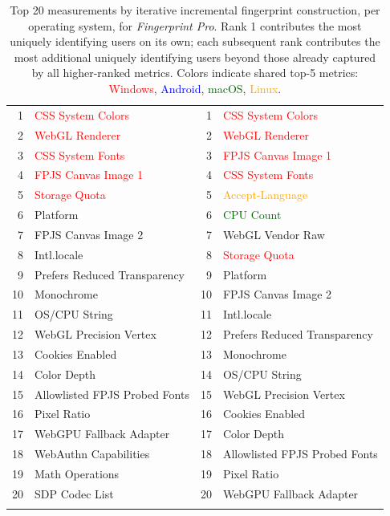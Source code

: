 \begin{table}[H]
\begin{tabular}{r l | r l}
\Xhline{2\arrayrulewidth}
1 & \textcolor{red}{CSS System Colors} & 1 & \textcolor{red}{CSS System Colors} \\
2 & \textcolor{red}{WebGL Renderer} & 2 & \textcolor{red}{WebGL Renderer} \\
3 & \textcolor{red}{CSS System Fonts} & 3 & \textcolor{red}{FPJS Canvas Image 1} \\
4 & \textcolor{red}{FPJS Canvas Image 1} & 4 & \textcolor{red}{CSS System Fonts} \\
5 & \textcolor{red}{Storage Quota} & 5 & \textcolor{orange}{Accept-Language} \\
6 & Platform & 6 & \textcolor{darkgreen}{CPU Count} \\
7 & FPJS Canvas Image 2 & 7 & WebGL Vendor Raw \\
8 & Intl.locale & 8 & \textcolor{red}{Storage Quota} \\
9 & Prefers Reduced Transparency & 9 & Platform \\
10 & Monochrome & 10 & FPJS Canvas Image 2 \\
11 & OS/CPU String & 11 & Intl.locale \\
12 & WebGL Precision Vertex & 12 & Prefers Reduced Transparency \\
13 & Cookies Enabled & 13 & Monochrome \\
14 & Color Depth & 14 & OS/CPU String \\
15 & Allowlisted FPJS Probed Fonts & 15 & WebGL Precision Vertex \\
16 & Pixel Ratio & 16 & Cookies Enabled \\
17 & WebGPU Fallback Adapter & 17 & Color Depth \\
18 & WebAuthn Capabilities & 18 & Allowlisted FPJS Probed Fonts \\
19 & Math Operations & 19 & Pixel Ratio \\
20 & SDP Codec List & 20 & WebGPU Fallback Adapter \\
\Xhline{2\arrayrulewidth}
\end{tabular}
\caption{Top 20 measurements by iterative incremental fingerprint construction, per operating system, for \textit{Fingerprint Pro}. Rank 1 contributes the most uniquely identifying users on its own; each subsequent rank contributes the most additional uniquely identifying users beyond those already captured by all higher-ranked metrics. Colors indicate shared top-5 metrics: \textcolor{red}{Windows}, \textcolor{blue}{Android}, \textcolor{darkgreen}{macOS}, \textcolor{orange}{Linux}.}
\label{tab:iterative_top20_by_os}
\end{table}
